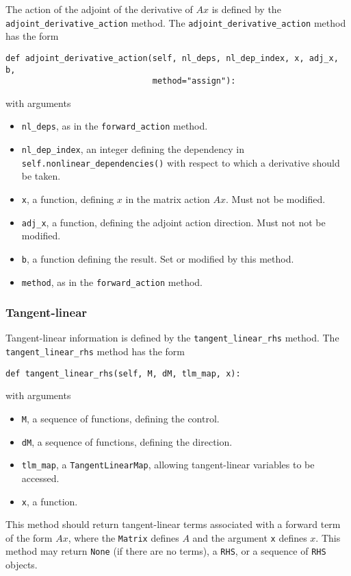 \documentclass[11pt]{article}
\begin{document}
The action of the adjoint of the derivative of $A x$ is defined by the
\texttt{adjoint\_derivative\_action} method. The
\texttt{adjoint\_derivative\_action} method has the form
\begin{lstlisting}
def adjoint_derivative_action(self, nl_deps, nl_dep_index, x, adj_x, b,
                              method="assign"):
\end{lstlisting}
with arguments
\begin{itemize}
  \item \texttt{nl\_deps}, as in the \texttt{forward\_action} method.
  \item \texttt{nl\_dep\_index}, an integer defining the dependency in
    \texttt{self.nonlinear\_dependencies()} with respect to which a derivative
    should be taken.
  \item \texttt{x}, a function, defining $x$ in the matrix action $A x$. Must
    not be modified.
  \item \texttt{adj\_x}, a function, defining the adjoint action direction.
    Must not not be modified.
  \item \texttt{b}, a function defining the result. Set or modified by this
    method.
  \item \texttt{method}, as in the \texttt{forward\_action} method.
\end{itemize}

\subsubsection{Tangent-linear}

Tangent-linear information is defined by the \texttt{tangent\_linear\_rhs}
method. The \texttt{tangent\_linear\_rhs} method has the form
\begin{lstlisting}
def tangent_linear_rhs(self, M, dM, tlm_map, x):
\end{lstlisting}
with arguments
\begin{itemize}
  \item \texttt{M}, a sequence of functions, defining the control.
  \item \texttt{dM}, a sequence of functions, defining the direction.
  \item \texttt{tlm\_map}, a \texttt{TangentLinearMap}, allowing tangent-linear
    variables to be accessed.
  \item \texttt{x}, a function.
\end{itemize}
This method should return tangent-linear terms associated with a forward term
of the form $A x$, where the \texttt{Matrix} defines $A$ and the argument
\texttt{x} defines $x$. This method may return \texttt{None} (if there are no
terms), a \texttt{RHS}, or a sequence of \texttt{RHS} objects.
\end{document}
